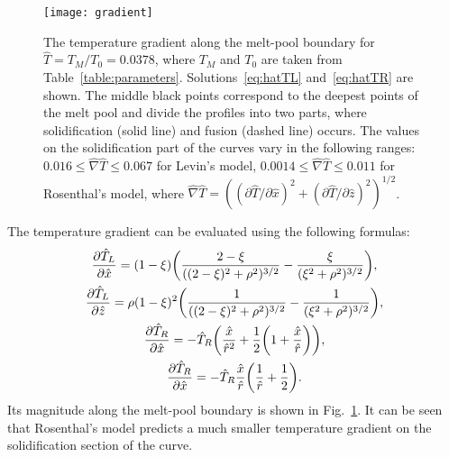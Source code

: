 \documentclass{article}
\begin{document}
\begin{figure}
    \centering
    \texttt{[image: gradient]}
    \caption{
        The temperature gradient along the melt-pool boundary for $\hat{T}=T_M/T_0=0.0378$,
        where $T_M$ and $T_0$ are taken from Table~\ref{table:parameters}.
        Solutions~\eqref{eq:hatTL} and~\eqref{eq:hatTR} are shown.
        The middle black points correspond to the deepest points of the melt pool
        and divide the profiles into two parts,
        where solidification (solid line) and fusion (dashed line) occurs.
        The values on the solidification part of the curves vary in the following ranges:
        $0.016 \leq \hat{\nabla}\hat{T} \leq 0.067$ for Levin's model,
        $0.0014 \leq \hat{\nabla}\hat{T} \leq 0.011$ for Rosenthal's model,
        where $\hat{\nabla}\hat{T} = ((\partial\hat{T}/\partial\hat{x})^2 + (\partial\hat{T}/\partial\hat{z})^2)^{1/2}$.
    }\label{fig:gradient}
\end{figure}

The temperature gradient can be evaluated using the following formulas:
\begin{gather}
    \pdv{\hat{T}_L}{\hat{x}} =
        (1-\xi)\qty( \frac{2-\xi}{((2-\xi)^2 + \rho^2)^{3/2}} - \frac{\xi}{(\xi^2 + \rho^2)^{3/2}} ), \label{eq:dTLdx}\\
    \pdv{\hat{T}_L}{\hat{z}} =
        \rho(1-\xi)^2\qty( \frac1{((2-\xi)^2 + \rho^2)^{3/2}} - \frac1{(\xi^2 + \rho^2)^{3/2}} ), \label{eq:dTLdz}\\
    \pdv{\hat{T}_R}{\hat{x}} =
        -\hat{T}_R\qty( \frac{\hat{x}}{\hat{r}^2} + \frac12\qty(1 + \frac{\hat{x}}{\hat{r}}) ), \label{eq:dTRdx}\\
    \pdv{\hat{T}_R}{\hat{x}} =
        -\hat{T}_R\frac{\hat{x}}{\hat{r}}\qty( \frac1{\hat{r}} + \frac12 ). \label{eq:dTRdz}
\end{gather}
Its magnitude along the melt-pool boundary is shown in Fig.~\ref{fig:gradient}.
It can be seen that Rosenthal's model predicts a much smaller temperature gradient
on the solidification section of the curve.

\printbibliography
\end{document}
